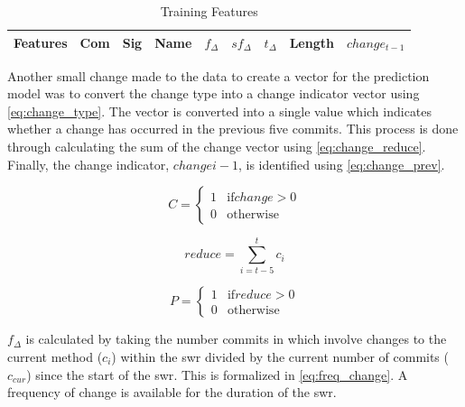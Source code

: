 \begin{table}
\begin{center}

    \begin{tabular}{|c|c|c|c|c|c|c|c|c|}
        \hline
        Features & Com & Sig & Name & $f_{\Delta}$ & $sf_{\Delta}$ & $t_\Delta$ & Length & $change_{t-1}$ \\ \hline
    \end{tabular}
    \caption{Training Features}
    \label{tab:training_features}
\end{center}

\end{table}

Another small change made to the data to create a vector for the prediction model was to convert the change type into a change indicator vector using \autoref{eq:change_type}. The vector is converted into a single value which indicates whether a change has occurred in the previous five commits. This process is done through calculating the sum of the change vector using \autoref{eq:change_reduce}. Finally, the change indicator, $change{i-1}$, is identified using \autoref{eq:change_prev}.

\begin{equation} 
\label{eq:change_type}
C = \left\{\begin{matrix}
1 & \text{if} change > 0 \\
0 & \text{otherwise}
\end{matrix}\right.
\end{equation}

\begin{equation} 
\label{eq:change_reduce}
reduce = \sum_{i=t-5}^{t}{c_i}
\end{equation}

\begin{equation} 
\label{eq:change_prev}
P = \left\{\begin{matrix}
1 & \text{if} reduce > 0 \\
0 & \text{otherwise}
\end{matrix}\right.
\end{equation}

$f_{\Delta}$ is calculated by taking the number commits in which involve changes to the current method ($c_i$) within the \gls{swr} divided by the current number of commits ($c_{cur}$) since the start of the \gls{swr}. This is formalized in \autoref{eq:freq_change}. A frequency of change is available for the duration of the \gls{swr}.

